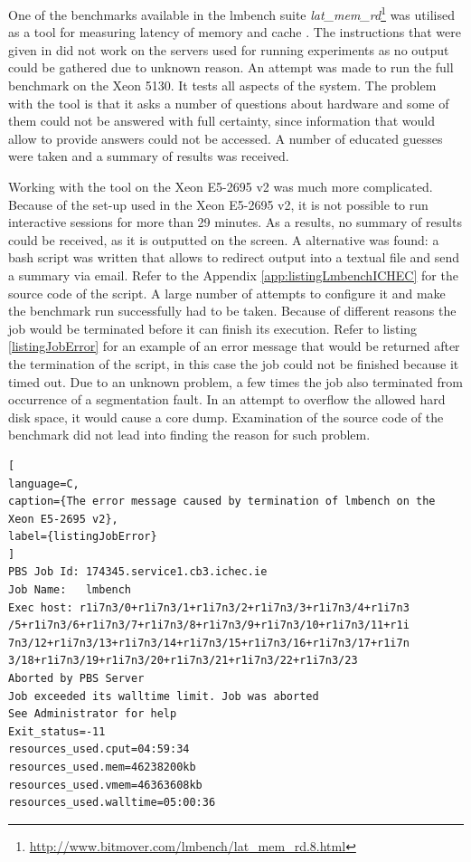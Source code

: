 One of the benchmarks available in the lmbench suite \textit{lat\_mem\_rd}\footnote{\url{http://www.bitmover.com/lmbench/lat_mem_rd.8.html}} was utilised as a tool for measuring latency of memory and cache \cite{Ruggiero2008}. The instructions that were given in \cite{Ruggiero2008} did not work on the servers used for running experiments as no output could be gathered due to unknown reason. An attempt was made to run the full benchmark on the Xeon 5130. It tests all aspects of the system. The problem with the tool is that it asks a number of questions about hardware and some of them could not be answered with full certainty, since information that would allow to provide answers could not be accessed. A number of educated guesses were taken and a summary of results was received.  

Working with the tool on the Xeon E5-2695 v2 was much more complicated. Because of the set-up used in the Xeon E5-2695 v2, it is not possible to run interactive sessions for more than 29 minutes. As a results, no summary of results could be received, as it is outputted on the screen. A alternative was found: a bash script was written that allows to redirect output into a textual file and send a summary via email. Refer to the Appendix \ref{app:listingLmbenchICHEC} for the source code of the script. A large number of attempts to configure it and make the benchmark run successfully had to be taken. Because of different reasons the job would be terminated before it can finish its execution. Refer to listing \ref{listingJobError} for an example of an error message that would be returned after the termination of the script, in this case the job could not be finished because it timed out. Due to an unknown problem, a few times the job also terminated from occurrence of a segmentation fault. In an attempt to overflow the allowed hard disk space, it would cause a core dump. Examination of the source code of the benchmark did not lead into finding the reason for such problem.

\begin{lstlisting}[
language=C,
caption={The error message caused by termination of lmbench on the Xeon E5-2695 v2},
label={listingJobError}
]
PBS Job Id: 174345.service1.cb3.ichec.ie
Job Name:   lmbench
Exec host: r1i7n3/0+r1i7n3/1+r1i7n3/2+r1i7n3/3+r1i7n3/4+r1i7n3
/5+r1i7n3/6+r1i7n3/7+r1i7n3/8+r1i7n3/9+r1i7n3/10+r1i7n3/11+r1i
7n3/12+r1i7n3/13+r1i7n3/14+r1i7n3/15+r1i7n3/16+r1i7n3/17+r1i7n
3/18+r1i7n3/19+r1i7n3/20+r1i7n3/21+r1i7n3/22+r1i7n3/23
Aborted by PBS Server 
Job exceeded its walltime limit. Job was aborted
See Administrator for help
Exit_status=-11
resources_used.cput=04:59:34
resources_used.mem=46238200kb
resources_used.vmem=46363608kb
resources_used.walltime=05:00:36
\end{lstlisting}

